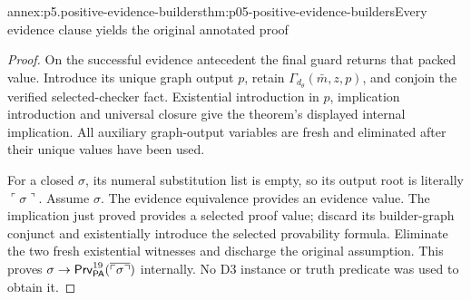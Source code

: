 \begin{annexitem}{annex:p5.positive-evidence-builders}{thm:p05-positive-evidence-builders}{Every evidence clause yields the original annotated proof}
\begin{proof}
On the successful evidence antecedent the final guard returns that
packed value. Introduce its unique graph output \(p\), retain
\(\Gamma_{d_\theta}(\bar m,z,p)\), and conjoin the verified
selected-checker fact. Existential introduction in \(p\), implication
introduction and universal closure give the theorem's displayed
internal implication. All auxiliary graph-output variables are fresh
and eliminated after their unique values have been used.

For a closed \(\sigma\), its numeral substitution list is empty,
so its output root is literally \(\ulcorner\sigma\urcorner\).
Assume \(\sigma\). The evidence equivalence provides an evidence
value. The implication just proved provides a selected proof value;
discard its builder-graph conjunct and existentially introduce the
selected provability formula. Eliminate the two fresh existential
witnesses and discharge the original assumption. This proves
\(\sigma\to\mathsf{Prv}^{19}_{\mathsf{PA}}
(\overline{\ulcorner\sigma\urcorner})\) internally. No D3
instance or truth predicate was used to obtain it.
\end{proof}
\end{annexitem}

